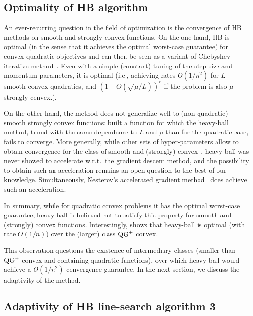     \subsection{Optimality of HB algorithm}
    \label{subsec:optimality-of-hb-algorithm}

        An ever-recurring question in the field of optimization is the convergence of HB methods on smooth and strongly convex functions.
        On the one hand, HB is optimal (in the sense that it achieves the optimal worst-case guarantee) for convex quadratic objectives and can then be seen as a variant of Chebyshev iterative method~\citep{flanders1950numerical,lanczos1952solution, young1953richardson}.
        Even with a simple (constant) tuning of the step-size and momentum parameters, it is optimal (i.e., achieving rates $O(1/n^2)$ for $L$-smooth convex quadratics, and $(1-O(\sqrt{\mu/L}))^n$ if the problem is also $\mu$-strongly convex.).

        On the other hand, the  method does not generalize well to (non quadratic) smooth strongly convex functions: \citet[Figure 7]{lessard2016analysis} built a function for which the heavy-ball method, tuned with the same dependence to $L$ and $\mu$ than for the quadratic case, fails to converge.
        More generally, while other sets of hyper-parameters allow to obtain convergence for the class of smooth and (strongly) convex~\citep{ghadimi2014global}, heavy-ball was never showed to accelerate w.r.t.~the gradient descent method, and the possibility to obtain such an acceleration remains an open question to the best of our knowledge.
        Simultaneously, Nesterov's accelerated gradient method~\citep{nesterov1983method} does achieve such an acceleration.

        In summary, while for quadratic convex problems it has the optimal worst-case guarantee, heavy-ball is believed not to satisfy this property for smooth and (strongly) convex functions.
        Interestingly,  shows that heavy-ball is optimal (with rate $O(1/n)$) over the (larger) class $\operatorname{QG}^+$ convex.

        This observation questions the existence of intermediary classes (smaller than $\operatorname{QG}^+$ convex and containing quadratic functions), over which heavy-ball would achieve a $O(1/n^2)$ convergence guarantee.
        In the next section, we discuss the adaptivity of the method.

    \subsection{\texorpdfstring{Adaptivity of HB line-search algorithm 3}{Adaptivity of HB line-search algorithm~\ref{alg:ogm_ls}}}
    \label{subsec:adaptivity_hb_line-search}

